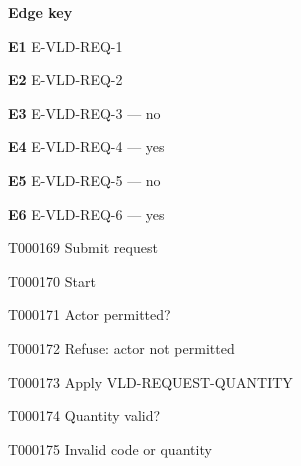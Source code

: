 \documentclass[11pt,a4paper]{article}
\begin{document}
\noindent\textbf{Edge key}\par
\begingroup\small\raggedright\setlength{\parskip}{1pt}
\noindent\textbf{E1} E-VLD-REQ-1\par
\noindent\textbf{E2} E-VLD-REQ-2\par
\noindent\textbf{E3} E-VLD-REQ-3 --- no\par
\noindent\textbf{E4} E-VLD-REQ-4 --- yes\par
\noindent\textbf{E5} E-VLD-REQ-5 --- no\par
\noindent\textbf{E6} E-VLD-REQ-6 --- yes\par
\endgroup
\clearpage
\begin{atlastext}{T000169}
Submit request
\end{atlastext}
\begin{atlastext}{T000170}
Start
\end{atlastext}
\begin{atlastext}{T000171}
Actor permitted?
\end{atlastext}
\begin{atlastext}{T000172}
Refuse: actor not permitted
\end{atlastext}
\begin{atlastext}{T000173}
Apply VLD-REQUEST-QUANTITY
\end{atlastext}
\begin{atlastext}{T000174}
Quantity valid?
\end{atlastext}
\begin{atlastext}{T000175}
Invalid code or quantity
\end{atlastext}
\end{document}
